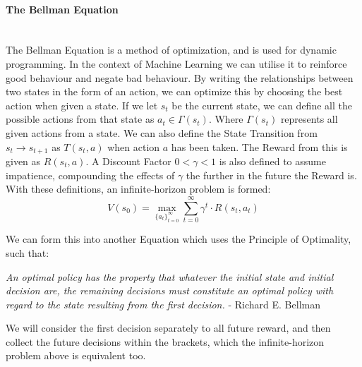 \begin{flushleft}
                \paragraph{The Bellman Equation} \mbox{} \\
                    The Bellman Equation is a method of optimization, and is used for dynamic programming. In the context of Machine Learning we can utilise it
                    to reinforce good behaviour and negate bad behaviour. By writing the relationships between two states in the form of an action, we can optimize this
                    by choosing the best action when given a state. If we let $s_{t}$ be the current state, we can define all the possible actions from that state as
                    $a_{t} \in \Gamma(s_{t})$. Where $\Gamma(s_{t})$ represents all given actions from a state. We can also define the State Transition from $s_{t} \to s_{t+1}$ 
                    as $T(s_{t}, a)$ when action $a$ has been taken. The Reward from this is given as $R(s_{t}, a)$. A Discount Factor $0 < \gamma < 1$ is also defined to assume
                    impatience, compounding the effects of $\gamma$ the further in the future the Reward is. \\
                    \vspace{0.2cm}
                    With these definitions, an infinite-horizon problem is formed: \\

                    \[ V(s_{0}) = \max_{\{a_{t}\}_{t=0}^{\infty}} \sum_{t=0}^{\infty} \gamma^{t} \cdot R(s_{t},a_{t}) \]
                    \vspace{0.2cm}

                    We can form this into another Equation which uses the Principle of Optimality, such that: \\
                    \vspace{0.2cm}

                    \begin{center}
                        \textit{An optimal policy has the property that whatever the initial state and initial decision are, the remaining decisions must constitute an 
                        optimal policy with regard to the state resulting from the first decision.} - Richard E. Bellman
                    \end{center}
                    \vspace{0.2cm}

                    We will consider the first decision separately to all future reward, and then collect the future decisions within the brackets, which the infinite-horizon problem
                    above is equivalent too.


\end{flushleft}
